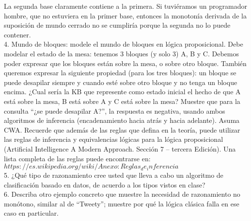La segunda base claramente contiene a la primera. Si tuviéramos un programador hombre, que no estuviera en la primer base, entonces la monotonía derivada de la suposición de mundo cerrado no se cumpliría porque la segunda no lo puede contener.\\


4. Mundo de bloques: modele el mundo de bloques en lógica proposicional. Debe modelar el estado de la mesa: tenemos 3 bloques (y solo 3) A, B y C. Debemos poder expresar que los bloques están sobre la mesa, o sobre otro bloque. También queremos expresar la siguiente propiedad (para los tres bloques): un bloque se puede desapilar siempre y cuando esté sobre otro bloque y no tenga un bloque encima. ¿Cual sería la KB que represente como estado inicial el hecho de que A está sobre la mesa, B está sobre A y C está sobre la mesa? Muestre que para la consulta “¿se puede desapilar A?”, la respuesta es negativa, usando ambos algoritmos de inferencia (encadenamiento hacia atrás y hacia adelante). Asuma CWA. Recuerde que además de las reglas que defina en la teoría, puede utilizar las reglas de inferencia y equivalencias lógicas para la lógica proposicional (Artificial Intelligence A Modern Approach. Sección 7 – tercera Edición). Una lista completa de las reglas puede encontrarse en: $https://es.wikipedia.org/wiki/Anexo:Reglas_de_inferencia$\\

5. ¿Qué tipo de razonamiento cree usted que lleva a cabo un algoritmo de clasificación basado en datos, de acuerdo a los tipos vistos en clase?\\

6. Describa otro ejemplo concreto que muestre la necesidad de razonamiento no monótono, similar al de “Tweety”; muestre por qué la lógica clásica falla en ese caso en particular.


\bigskip